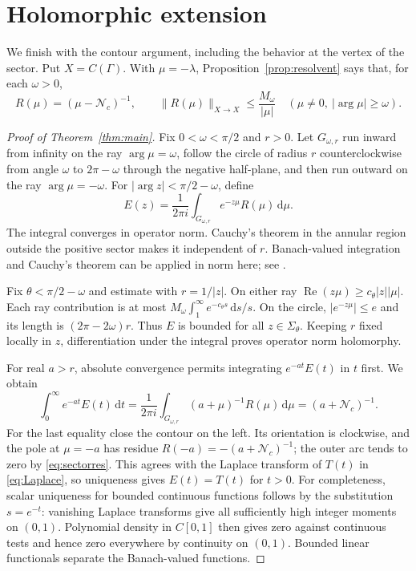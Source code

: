 \documentclass[11pt]{article}
\newcommand{\Nc}{\mathcal N_c}
\newcommand{\dd}{\,\mathrm d}
\newcommand{\norm}[1]{\lVert #1\rVert}
\newcommand{\abs}[1]{\lvert #1\rvert}
\begin{document}
\section{Holomorphic extension}

We finish with the contour argument, including the behavior at the vertex
of the sector. Put $X=C(\Gamma)$. With $\mu=-\lambda$,
Proposition~\ref{prop:resolvent} says that, for each $\omega>0$,
\begin{equation}\label{eq:sectorres}
 R(\mu)=(\mu-\Nc)^{-1},\qquad
 \norm{R(\mu)}_{X\to X}\leq\frac{M_\omega}{\abs\mu}
 \quad(\mu\neq0,\ \abs{\arg\mu}\geq\omega).
\end{equation}

\begin{proof}[Proof of Theorem~\ref{thm:main}]
Fix $0<\omega<\pi/2$ and $r>0$. Let $G_{\omega,r}$ run inward from infinity
on the ray $\arg\mu=\omega$, follow the circle of radius $r$
counterclockwise from angle $\omega$ to $2\pi-\omega$ through the negative
half-plane, and then run outward on the ray $\arg\mu=-\omega$.
For $\abs{\arg z}<\pi/2-\omega$, define
\begin{equation}\label{eq:contour}
 E(z)=\frac1{2\pi i}\int_{G_{\omega,r}}e^{-z\mu}R(\mu)\dd\mu.
\end{equation}
The integral converges in operator norm. Cauchy's theorem in the annular
region outside the positive sector makes it independent of $r$.
Banach-valued integration and Cauchy's theorem can be applied in norm here;
see \cite[Theorems 3.27, 3.29 and 3.31]{RudinFA}.

Fix $\theta<\pi/2-\omega$ and estimate with $r=1/\abs z$.
On either ray $\operatorname{Re}(z\mu)\geq c_\theta\abs z\abs\mu$.
Each ray contribution is at most
$M_\omega\int_1^\infty e^{-c_\theta s}\dd s/s$.
On the circle, $\abs{e^{-z\mu}}\leq e$ and its length is
$(2\pi-2\omega)r$. Thus $E$ is bounded for all $z\in\Sigma_\theta$.
Keeping $r$ fixed locally in $z$, differentiation under the integral proves
operator norm holomorphy.

For real $a>r$, absolute convergence permits integrating
$e^{-at}E(t)$ in $t$ first. We obtain
\[
 \int_0^\infty e^{-at}E(t)\dd t
   =\frac1{2\pi i}\int_{G_{\omega,r}}(a+\mu)^{-1}R(\mu)\dd\mu
   =(a+\Nc)^{-1}.
\]
For the last equality close the contour on the left. Its orientation is
clockwise, and the pole at $\mu=-a$ has residue
$R(-a)=-(a+\Nc)^{-1}$; the outer arc tends to zero by
\eqref{eq:sectorres}. This agrees with the Laplace transform of $T(t)$ in
\eqref{eq:Laplace}, so uniqueness gives $E(t)=T(t)$ for $t>0$.
For completeness, scalar uniqueness for bounded continuous functions follows
by the substitution $s=e^{-t}$: vanishing Laplace transforms give all
sufficiently high integer moments on $(0,1)$. Polynomial density in
$C[0,1]$ then gives zero against continuous tests and hence zero everywhere
by continuity on $(0,1)$. Bounded linear functionals separate the
Banach-valued functions.


\end{proof}
\end{document}
